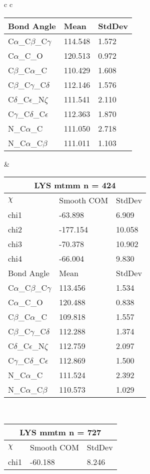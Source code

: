 \begin{longtable}{ c c }
\begin{tabular}{ l l l }
  Bond Angle   & Mean     & StdDev \\ \midrule
  C$\alpha$\_C$\beta$\_C$\gamma$ & 114.548 & 1.572\\
  C$\alpha$\_C\_O & 120.513 & 0.972\\
  C$\beta$\_C$\alpha$\_C & 110.429 & 1.608\\
  C$\beta$\_C$\gamma$\_C$\delta$ & 112.146 & 1.576\\
  C$\delta$\_C$\epsilon$\_N$\zeta$ & 111.541 & 2.110\\
  C$\gamma$\_C$\delta$\_C$\epsilon$ & 112.363 & 1.870\\
  N\_C$\alpha$\_C & 111.050 & 2.718\\
  N\_C$\alpha$\_C$\beta$ & 111.011 & 1.103\\
  \bottomrule
  \end{tabular}
  &
  \begin{tabular}{ l l l }
  \toprule
  \multicolumn{3}{c}{LYS \textbf{mtmm} n = 424} \\ \toprule
  $\chi$       & Smooth COM & StdDev \\ \midrule
  chi1 & -63.898 & 6.909 \\ 
  chi2 & -177.154 & 10.058 \\ 
  chi3 & -70.378 & 10.902 \\ 
  chi4 & -66.004 & 9.830 \\ \midrule
  Bond Angle   & Mean     & StdDev \\ \midrule
  C$\alpha$\_C$\beta$\_C$\gamma$ & 113.456 & 1.534\\
  C$\alpha$\_C\_O & 120.488 & 0.838\\
  C$\beta$\_C$\alpha$\_C & 109.818 & 1.557\\
  C$\beta$\_C$\gamma$\_C$\delta$ & 112.288 & 1.374\\
  C$\delta$\_C$\epsilon$\_N$\zeta$ & 112.759 & 2.097\\
  C$\gamma$\_C$\delta$\_C$\epsilon$ & 112.869 & 1.500\\
  N\_C$\alpha$\_C & 111.524 & 2.392\\
  N\_C$\alpha$\_C$\beta$ & 110.573 & 1.029\\
  \bottomrule
  \end{tabular}
  \\
  \begin{tabular}{ l l l }
  \toprule
  \multicolumn{3}{c}{LYS \textbf{mmtm} n = 727} \\ \toprule
  $\chi$       & Smooth COM & StdDev \\ \midrule
  chi1 & -60.188 & 8.246 \\ 

\end{tabular}
\end{longtable}
